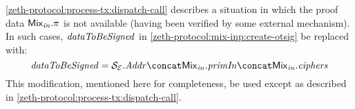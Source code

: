\begin{remark}\label{zeth-protocol:mix-inp:otsig-for-dispatch-call}
  \cref{zeth-protocol:process-tx:dispatch-call} describes a situation in which the proof data $\mathit{{\mathsf{Mix}}_{in}}.\mathit{\pi}$ is not available (having been verified by some external mechanism). In such cases, $\mathit{dataToBeSigned}$ in \cref{zeth-protocol:mix-inp:create-otsig} \MAY{} be replaced with:
  \[
  \datatobesigned = \eparty{S}.\addr \concat \inp{\mix}.\primInp \concat \inp{\mix}.\ciphers
  \]
  This modification, mentioned here for completeness, \MUSTNOT{} be used except as described in \cref{zeth-protocol:process-tx:dispatch-call}.
\end{remark}
